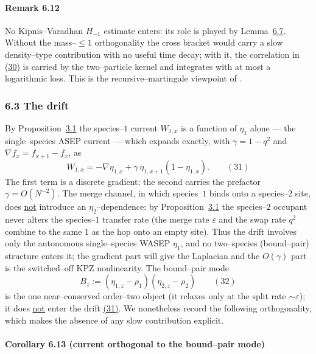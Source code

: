 \documentclass[11pt]{article}
\theoremstyle{plain}
\theoremstyle{definition}
\theoremstyle{remark}
\newcommand{\eps}{\varepsilon}\newcommand{\Exp}{\mathrm{Exp}}
\begin{document}
\paragraph{Remark 6.12}\label{rem_noH}

No Kipnis--Varadhan $H_{-1}$ estimate enters: its role is played by
Lemma~\hyperref[lem_orth]{6.7}. Without the mass--$\le1$ orthogonality the cross bracket would
carry a slow density--type contribution with no useful time decay; with it, the
correlation in \hyperref[eq_Ctheta]{(30)} is carried by the two--particle kernel and
integrates with at most a logarithmic loss. This is the recursive--martingale
viewpoint of \cite{ACR2}.
\par

\subsubsection{6.3 The drift}
By Proposition~\hyperref[prop_decouple]{3.1} the species--$1$ current $W_{1,x}$ is a function of
$\eta_1$ alone --- the single--species ASEP current --- which expands exactly, with
$\gamma=1-q^2$ and $\nabla f_x=f_{x+1}-f_x$, as
\label{eq_Wgrad}
\begin{equation}
  W_{1,x}=-\nabla\eta_{1,x}+\gamma\,\eta_{1,x+1}(1-\eta_{1,x}).\qquad(31)
\end{equation}
The first term is a discrete gradient; the second carries the prefactor
$\gamma=O(N^{-2})$. The merge channel, in which species~$1$ binds onto a species--$2$
site, does \underline{not} introduce an $\eta_2$--dependence: by
Proposition~\hyperref[prop_decouple]{3.1} the species--$2$ occupant never alters the species--$1$
transfer rate (the merge rate $\eps$ and the swap rate $q^2$ combine to the same $1$ as
the hop onto an empty site). Thus the drift involves only the autonomous single--species
WASEP $\eta_1$, and no two--species (bound--pair) structure enters it; the gradient part
will give the Laplacian and the $O(\gamma)$ part is the switched--off KPZ nonlinearity.
The bound--pair mode
\label{eq_Bdef}
\begin{equation}
  B_z:=(\eta_{1,z}-\rho_1)(\eta_{2,z}-\rho_2)\qquad(32)
\end{equation}
is the one near--conserved order--two object (it relaxes only at the split rate
$\sim\eps$); it does \underline{not} enter the drift \hyperref[eq_Wgrad]{(31)}. We nonetheless record
the following orthogonality, which makes the absence of any slow contribution explicit.

\paragraph{Corollary 6.13 (current orthogonal to the bound--pair mode)}\label{prop_sym}
\end{document}
